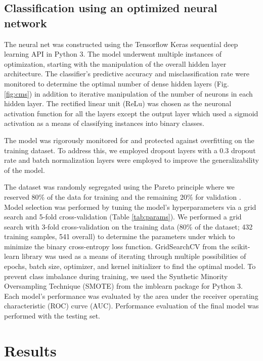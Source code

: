 \documentclass[10pt, letterpaper]{article}
\begin{document}
\begin{multicols}{2}
\subsection*{Classification using an optimized neural network}
The neural net was constructed using the Tensorflow Keras sequential deep learning API in Python 3. The model underwent multiple instances of optimization, starting with the manipulation of the overall hidden layer architecture. The classifier’s predictive accuracy and misclassification rate were monitored to determine the optimal number of dense hidden layers (Fig. \ref{fig:cms}) in addition to iterative manipulation of the number of neurons in each hidden layer. The rectified linear unit (ReLu) was chosen as the neuronal activation function for all the layers except the output layer which used a sigmoid activation as a means of classifying instances into binary classes.

The model was rigorously monitored for and protected against overfitting on the training dataset. To address this, we employed dropout layers with a 0.3 dropout rate and batch normalization layers were employed to improve the generalizability of the model.

The dataset was randomly segregated using the Pareto principle where we reserved 80\% of the data for training and the remaining 20\% for validation \cite{pareto}. Model selection was performed by tuning the model’s hyperparameters via a grid search and 5-fold cross-validation (Table \ref{tab:params}). We performed a grid search with 3-fold cross-validation on the training data (80\% of the dataset; 432 training samples, 541 overall) to determine the parameters under which to minimize the binary cross-entropy loss function. GridSearchCV from the scikit-learn library was used as a means of iterating through multiple possibilities of epochs, batch size, optimizer, and kernel initializer to find the optimal model. To prevent class imbalance during training, we used the Synthetic Minority Oversampling Technique (SMOTE) from the imblearn package for Python 3. Each model’s performance was evaluated by the area under the receiver operating characteristic (ROC) curve (AUC). Performance evaluation of the final model was performed with the testing set.


\section{Results}


\end{multicols}
\end{document}
